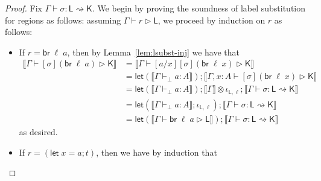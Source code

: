 \documentclass[acmsmall,screen,review]{acmart}
\newcommand{\ms}[1]{\ensuremath{\mathsf{#1}}}
\newcommand{\lto}{:}
\newcommand{\letstmt}[3]{\ensuremath{\ms{let}\;#1 = #2; #3}}
\newcommand{\brb}[2]{\ms{br}\;#1\;#2}
\newcommand{\wbranch}[3]{#1(#2) \lto \{#3\}}
\newcommand{\cfgsubst}[1]{\ms{cfgs}\;\{#1\}}
\newcommand{\bhyp}[2]{#1 : #2}
\newcommand{\lhyp}[2]{#1(#2)}
\newcommand{\hasty}[4]{#1 \vdash_{#2} #3: {#4}}
\newcommand{\haslb}[3]{#1 \vdash #2 \rhd #3}
\newcommand{\lbsubst}[4]{#1 \vdash #2: #3 \rightsquigarrow #4}
\newcommand{\dnt}[1]{\llbracket{#1}\rrbracket}
\newcommand{\loopmor}[3]{\ms{lsem}_{#1, #3}(#2)}
\newcommand{\lmor}[1]{\ms{let}(#1)}
\newcommand{\rfix}[1]{\ms{rfix}(#1)}
\begin{document}

\soundnesslsubst*

\label{proof:soundness-lsubst}

\begin{proof}
  Fix $\lbsubst{\Gamma}{\sigma}{\ms{L}}{\ms{K}}$. We begin by proving the soundness of label
  substitution for regions as follows: assuming $\haslb{\Gamma}{r}{\ms{L}}$, we proceed by induction
  on $r$ as follows:
  \begin{itemize}[leftmargin=*]
    \item If $r = \brb{\ell}{a}$, then by Lemma~\ref{lem:lsubst-inj} we have that
    \begin{equation}
      \begin{aligned}
        \dnt{\haslb{\Gamma}{[\sigma](\brb{\ell}{a})}{\ms{K}}}
        & = \dnt{\haslb{\Gamma}{[a/x][\sigma](\brb{\ell}{x})}{\ms{K}}} \\
        & = \lmor{\dnt{\hasty{\Gamma}{\bot}{a}{A}}}
          ; \dnt{\haslb{\Gamma, \bhyp{x}{A}}{[\sigma](\brb{\ell}{x})}{\ms{K}}} \\
        & = \lmor{\dnt{\hasty{\Gamma}{\bot}{a}{A}}}
          ; \dnt{\Gamma} \otimes \iota_{\ms{L}, \ell} 
          ; \dnt{\lbsubst{\Gamma}{\sigma}{\ms{L}}{\ms{K}}}
          \\
        & = \lmor{\dnt{\hasty{\Gamma}{\bot}{a}{A}} ; \iota_{\ms{L}, \ell}}
          ; \dnt{\lbsubst{\Gamma}{\sigma}{\ms{L}}{\ms{K}}} \\
        & = \lmor{\dnt{\haslb{\Gamma}{\brb{\ell}{a}}{\ms{L}}}}
          ; \dnt{\lbsubst{\Gamma}{\sigma}{\ms{L}}{\ms{K}}}
      \end{aligned}
    \end{equation}
    as desired.
    \item If $r = (\letstmt{x}{a}{t})$, then we have by induction that
    \begin{equation}

\end{equation}
\end{itemize}
\end{proof}
\end{document}
